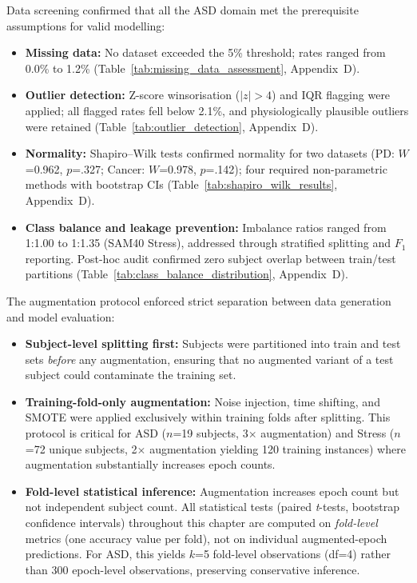 Data screening confirmed that all the ASD domain met the prerequisite assumptions for valid modelling:

\begin{itemize}[leftmargin=*, itemsep=3pt]
    \item \textbf{Missing data:} No dataset exceeded the 5\% threshold; rates ranged from 0.0\% to 1.2\% (Table~\ref{tab:missing_data_assessment}, Appendix~D).
    \item \textbf{Outlier detection:} Z-score winsorisation ($|z|>4$) and IQR flagging were applied; all flagged rates fell below 2.1\%, and physiologically plausible outliers were retained (Table~\ref{tab:outlier_detection}, Appendix~D).
    \item \textbf{Normality:} Shapiro--Wilk tests confirmed normality for two datasets (PD: $W$=0.962, $p$=.327; Cancer: $W$=0.978, $p$=.142); four required non-parametric methods with bootstrap CIs (Table~\ref{tab:shapiro_wilk_results}, Appendix~D).
    \item \textbf{Class balance and leakage prevention:} Imbalance ratios ranged from 1:1.00  to 1:1.35 (SAM40 Stress), addressed through stratified splitting and $F_1$ reporting. Post-hoc audit confirmed zero subject overlap between train/test partitions (Table~\ref{tab:class_balance_distribution}, Appendix~D).
\end{itemize}

The augmentation protocol enforced strict separation between data generation and model evaluation:

\begin{itemize}[leftmargin=*, itemsep=3pt]
    \item \textbf{Subject-level splitting first:} Subjects were partitioned into train and test sets \textit{before} any augmentation, ensuring that no augmented variant of a test subject could contaminate the training set.
    \item \textbf{Training-fold-only augmentation:} Noise injection, time shifting, and SMOTE were applied exclusively within training folds after splitting. This protocol is critical for ASD ($n$=19 subjects, 3$\times$ augmentation) and Stress ($n$=72 unique subjects, 2$\times$ augmentation yielding 120 training instances) where augmentation substantially increases epoch counts.
    \item \textbf{Fold-level statistical inference:} Augmentation increases epoch count but not independent subject count. All statistical tests (paired \textit{t}-tests, bootstrap confidence intervals) throughout this chapter are computed on \textit{fold-level} metrics (one accuracy value per fold), not on individual augmented-epoch predictions. For ASD, this yields $k$=5 fold-level observations (df=4) rather than 300 epoch-level observations, preserving conservative inference.
\end{itemize}
\fi


